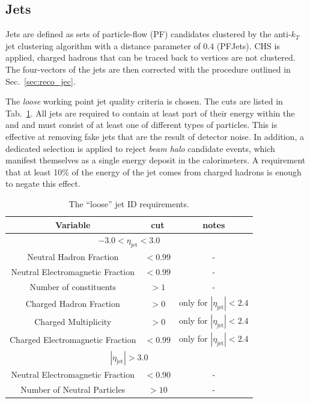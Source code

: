 \subsection{Jets}

Jets are defined as sets of particle-flow (PF) candidates clustered by
the anti-$k_{T}$ jet clustering algorithm \cite{Cacciari:2008gp} with
a distance parameter of 0.4 (PFJets). \acf{CHS} is applied, charged
hadrons that can be traced back to \PU vertices are not clustered. The
four-vectors of the jets are then corrected with the procedure
outlined in Sec.~\ref{sec:reco_jec}.

The \emph{loose} working point jet quality criteria is chosen.  The cuts
are listed in Tab.~\ref{tab:loose-jet-id}. All jets are required to
contain at least part of their energy within the \ECAL and \HCAL and
must consist of at least one of different types of particles. This is
effective at removing fake jets that are the result of detector noise.
In addition, a dedicated selection is applied to reject \emph{beam
halo} candidate events, which manifest themselves as a single energy
deposit in the calorimeters. A requirement that at least 10\% of the
energy of the jet comes from charged hadrons is enough to negate this
effect.

\begin{table}[ht!]
  \caption{The ``loose'' jet ID requirements. \label{tab:loose-jet-id}}
  \centering
  \begin{tabular}{ ccc }
    \hline
    \hline
    Variable & cut & notes \\ \hline
    \multicolumn{3}{c}{$-3.0 < \eta_{\mathrm{jet}} < 3.0$} \\ \hline    
    Neutral Hadron Fraction & $<0.99$ & - \\
    Neutral Electromagnetic Fraction & $<0.99$ & - \\
    Number of constituents & $>1$ & - \\
    Charged Hadron Fraction & $>0$ & only for $|\eta_{\mathrm{jet}}| < 2.4$ \\
    Charged Multiplicity & $>0$ & only for $|\eta_{\mathrm{jet}}| < 2.4$ \\
    Charged Electromagnetic Fraction & $<0.99$ & only for $|\eta_{\mathrm{jet}}| < 2.4$ \\ \hline
    \multicolumn{3}{c}{$|\eta_{\mathrm{jet}}| > 3.0$} \\ \hline        
    Neutral Electromagnetic Fraction & $<0.90$ & - \\
    Number of Neutral Particles & $>10$ & - \\
    \hline
    \hline
  \end{tabular}
\end{table}

